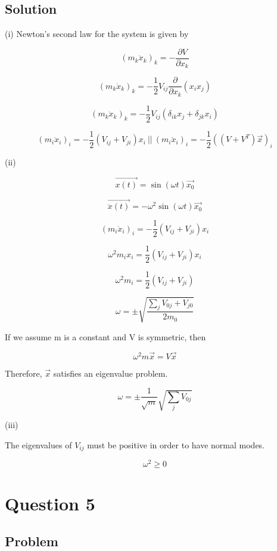 \documentclass[12pt]{article}
\begin{document}
\subsection{Solution}

(i) Newton's second law for the system is given by

\[
    {\left(m_k \ddot{x}_k\right) }_k = -\frac{\partial V}{\partial x_k}
\]

\[
    {\left(m_k \ddot{x}_k\right) }_k = -\frac{1}{2} V_{ij} \frac{\partial}{\partial x_k} (x_i x_j)
\]

\[
    {\left(m_k \ddot{x}_k\right) }_k = -\frac{1}{2} V_{ij} \left( \delta_{ik} x_j + \delta_{jk} x_i \right)
\]

\[
    {\left(m_i \ddot{x}_i\right) }_i = -\frac{1}{2} \left(V_{ij} + V_{ji}\right) x_i
    \ ||\ {\left(m_i \ddot{x}_i\right) }_i = -\frac{1}{2} {\left(\left(V + V^T\right) \vec{x}\right) }_i
\]

(ii)

\[
    \overrightarrow{x(t)} = \sin{\left(\omega t\right)} \overrightarrow{x_0}
\]

\[
    \overrightarrow{\ddot{x}(t)} = -\omega^2\sin{\left(\omega t\right)} \overrightarrow{x_0}
\]

\[
    {\left(m_i \ddot{x}_i\right) }_i = -\frac{1}{2} \left(V_{ij} + V_{ji}\right) x_i
\]

\[
    \omega^2 m_i x_i = \frac{1}{2} \left(V_{ij} + V_{ji}\right) x_i
\]

\[
    \omega^2 m_i = \frac{1}{2} \left(V_{ij} + V_{ji}\right)
\]

\[
    \omega = \pm \sqrt{\frac{\sum_j V_{0j} + V_{j0}}{2 m_0}}
\]

If we assume m is a constant and V is symmetric, then

\[
    \omega^2 m \vec{x} = V \vec{x}
\]

Therefore, \(\vec{x}\) satisfies an eigenvalue problem.

\[
    \omega = \pm \frac{1}{\sqrt{m}} \sqrt{\sum_j V_{0j}}
\]

(iii)

The eigenvalues of \(V_{ij}\) must be positive in order to have normal modes.

\[
    \omega^2 \geq 0
\]


\newpage
\section{Question 5}

\subsection{Problem}
\end{document}
